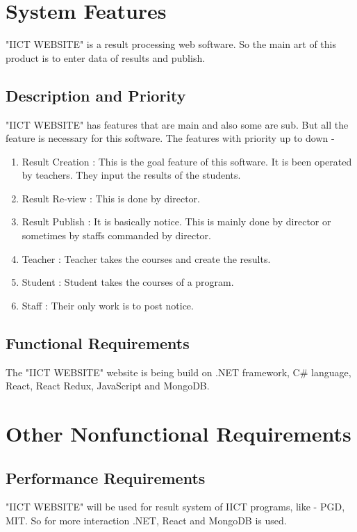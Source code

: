 \documentclass{scrreprt}
\begin{document}
    \chapter{System Features}
    "IICT WEBSITE" is a result processing web software. So the main art of this product is to enter data of results and publish. 
    
    \section{Description and Priority}
    "IICT WEBSITE" has features that are main and also some are sub. But all the feature is necessary for this software.
    \newline
    The features with priority up to down - 
    \begin{enumerate}
        \item Result Creation : This is the goal feature of this software. It is been operated by teachers. They input the results of the students.
        \item Result Re-view : This is done by director.
        \item Result Publish : It is basically notice. This is mainly done by director or sometimes by staffs commanded by director.
        \item Teacher : Teacher takes the courses and create the results.
        \item Student : Student takes the courses of a program.
        \item Staff : Their only work is to post notice.
    \end{enumerate}
    \section{Functional Requirements}
    The "IICT WEBSITE" website is being build on .NET framework, C\# language, React, React Redux, JavaScript and MongoDB.
   
    
    
    \chapter{Other Nonfunctional Requirements}
    
    \section{Performance Requirements}
    "IICT WEBSITE" will be used for result system of IICT programs, like - PGD, MIT. So for more interaction .NET, React and MongoDB is used. 
    
\end{document}
